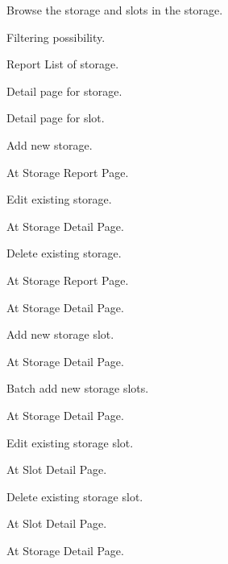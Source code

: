 \begin{compactenum}
	\item Browse the storage and slots in the storage.
        \begin{compactenum}
            \item Filtering possibility.
            \item Report List of storage.
            \item Detail page for storage.
            \item Detail page for slot.
        \end{compactenum}
    \item Add new storage.
        \begin{compactenum}
            \item At Storage Report Page.
        \end{compactenum}
    \item Edit existing storage.
        \begin{compactenum}
            \item At Storage Detail Page.
        \end{compactenum}
    \item Delete existing storage.
        \begin{compactenum}
            \item At Storage Report Page.
            \item At Storage Detail Page.
        \end{compactenum}
    \item Add new storage slot.
        \begin{compactenum}
            \item At Storage Detail Page.
        \end{compactenum}
    \item Batch add new storage slots.
        \begin{compactenum}
            \item At Storage Detail Page.
        \end{compactenum}
    \item Edit existing storage slot.
        \begin{compactenum}
            \item At Slot Detail Page.
        \end{compactenum}
    \item Delete existing storage slot.
        \begin{compactenum}
            \item At Slot Detail Page.
            \item At Storage Detail Page.
        \end{compactenum}
\end{compactenum}

